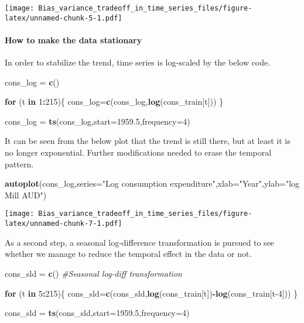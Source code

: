 \documentclass[
]{article}
\newenvironment{Shaded}{\begin{snugshade}}{\end{snugshade}}
\newcommand{\CommentTok}[1]{\textcolor[rgb]{0.56,0.35,0.01}{\textit{#1}}}
\newcommand{\ControlFlowTok}[1]{\textcolor[rgb]{0.13,0.29,0.53}{\textbf{#1}}}
\newcommand{\DataTypeTok}[1]{\textcolor[rgb]{0.13,0.29,0.53}{#1}}
\newcommand{\DecValTok}[1]{\textcolor[rgb]{0.00,0.00,0.81}{#1}}
\newcommand{\FloatTok}[1]{\textcolor[rgb]{0.00,0.00,0.81}{#1}}
\newcommand{\KeywordTok}[1]{\textcolor[rgb]{0.13,0.29,0.53}{\textbf{#1}}}
\newcommand{\NormalTok}[1]{#1}
\newcommand{\OperatorTok}[1]{\textcolor[rgb]{0.81,0.36,0.00}{\textbf{#1}}}
\newcommand{\StringTok}[1]{\textcolor[rgb]{0.31,0.60,0.02}{#1}}
\begin{document}
\texttt{[image: Bias\_variance\_tradeoff\_in\_time\_series\_files/figure-latex/unnamed-chunk-5-1.pdf]}

\hypertarget{how-to-make-the-data-stationary}{%
\paragraph{How to make the data
stationary}\label{how-to-make-the-data-stationary}}

In order to stabilize the trend, time series is log-scaled by the below
code.

\begin{Shaded}
\begin{Highlighting}[]
\NormalTok{cons_log =}\StringTok{ }\KeywordTok{c}\NormalTok{()}

\ControlFlowTok{for}\NormalTok{ (t }\ControlFlowTok{in} \DecValTok{1}\OperatorTok{:}\DecValTok{215}\NormalTok{)\{}
\NormalTok{  cons_log=}\KeywordTok{c}\NormalTok{(cons_log,}\KeywordTok{log}\NormalTok{(cons_train[t]))}
\NormalTok{\}}

\NormalTok{cons_log =}\StringTok{ }\KeywordTok{ts}\NormalTok{(cons_log,}\DataTypeTok{start=}\FloatTok{1959.5}\NormalTok{,}\DataTypeTok{frequency=}\DecValTok{4}\NormalTok{)}
\end{Highlighting}
\end{Shaded}

It can be seen from the below plot that the trend is still there, but at
least it is no longer exponential. Further modifications needed to erase
the temporal pattern.

\begin{Shaded}
\begin{Highlighting}[]
\KeywordTok{autoplot}\NormalTok{(cons_log,}\DataTypeTok{series=}\StringTok{"Log consumption expenditure"}\NormalTok{,}\DataTypeTok{xlab=}\StringTok{"Year"}\NormalTok{,}\DataTypeTok{ylab=}\StringTok{"log Mill AUD"}\NormalTok{)}
\end{Highlighting}
\end{Shaded}

\texttt{[image: Bias\_variance\_tradeoff\_in\_time\_series\_files/figure-latex/unnamed-chunk-7-1.pdf]}

As a second step, a seasonal log-difference transformation is pursued to
see whether we manage to reduce the temporal effect in the data or not.

\begin{Shaded}
\begin{Highlighting}[]
\NormalTok{cons_sld =}\StringTok{ }\KeywordTok{c}\NormalTok{() }\CommentTok{#Seasonal log-diff transformation}

\ControlFlowTok{for}\NormalTok{ (t }\ControlFlowTok{in} \DecValTok{5}\OperatorTok{:}\DecValTok{215}\NormalTok{)\{}
\NormalTok{  cons_sld=}\KeywordTok{c}\NormalTok{(cons_sld,}\KeywordTok{log}\NormalTok{(cons_train[t])}\OperatorTok{-}\KeywordTok{log}\NormalTok{(cons_train[t}\DecValTok{-4}\NormalTok{]))}
\NormalTok{\}}

\NormalTok{cons_sld =}\StringTok{ }\KeywordTok{ts}\NormalTok{(cons_sld,}\DataTypeTok{start=}\FloatTok{1959.5}\NormalTok{,}\DataTypeTok{frequency=}\DecValTok{4}\NormalTok{)}
\end{Highlighting}
\end{Shaded}
\end{document}
